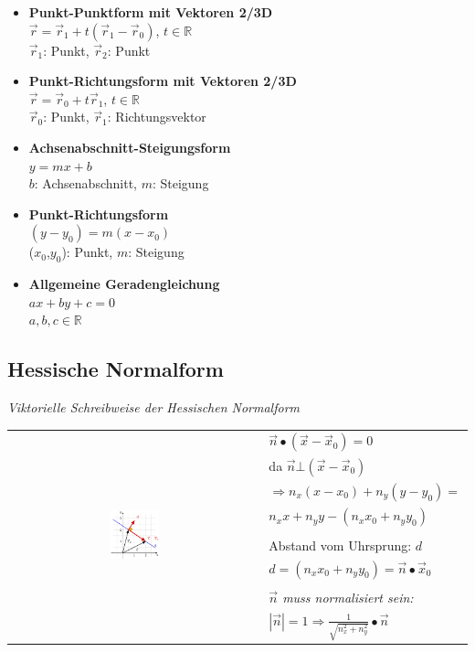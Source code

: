 \begin{itemize}
    \item \textbf{Punkt-Punktform mit Vektoren 2/3D} \\
          $\vec{r} = \vec{r}_1 + t(\vec{r}_1 - \vec{r}_0)$, $t \in \mathbb{R}$ \\
          $\vec{r}_1$: Punkt, $\vec{r}_2$: Punkt
    \item \textbf{Punkt-Richtungsform mit Vektoren 2/3D} \\
          $\vec{r} = \vec{r}_0 + t\vec{r}_1$, $t \in \mathbb{R}$ \\
          $\vec{r}_0$: Punkt, $\vec{r}_1$: Richtungsvektor
    \item \textbf{Achsenabschnitt-Steigungsform} \\
          $y=mx+b$ \\
          $b$: Achsenabschnitt, $m$: Steigung
    \item \textbf{Punkt-Richtungsform} \\
          $(y - y_0) = m(x - x_0)$ \\
          ($x_0$,$y_0$): Punkt, $m$: Steigung
    \item \textbf{Allgemeine Geradengleichung} \\
          $ax + by + c = 0$ \\
          $a,b,c \in \mathbb{R}$
\end{itemize}

\subsection{Hessische Normalform}

\textit{Viktorielle Schreibweise der Hessischen Normalform}
\begin{tabular}{cl}
    \multirow{10}{*}{
        \includegraphics[width=0.2\textwidth]{assets/hessischenormalform.png}
    }
     & $\vec{n} \bullet (\vec{x} - \vec{x}_0) = 0$ \\
     & da $\vec{n} \bot (\vec{x} - \vec{x}_0)$ \\
     & $\Rightarrow n_x(x - x_0) + n_y(y - y_0) = $\\
     & $n_x x + n_y y - (n_x x_0 + n_y y_0)$\\
     & \\
     & Abstand vom Uhrsprung: $d$ \\
     & $d = (n_x x_0 + n_y y_0) = \vec{n} \bullet \vec{x}_0$\\
     & \\
     & \textit{$\vec{n}$ muss normalisiert sein:} \\
     & $|\vec{n}| = 1 \Rightarrow \frac{1}{\sqrt{n_x^2 + n_y^2}} \bullet \vec{n}$ \\
\end{tabular} \\

